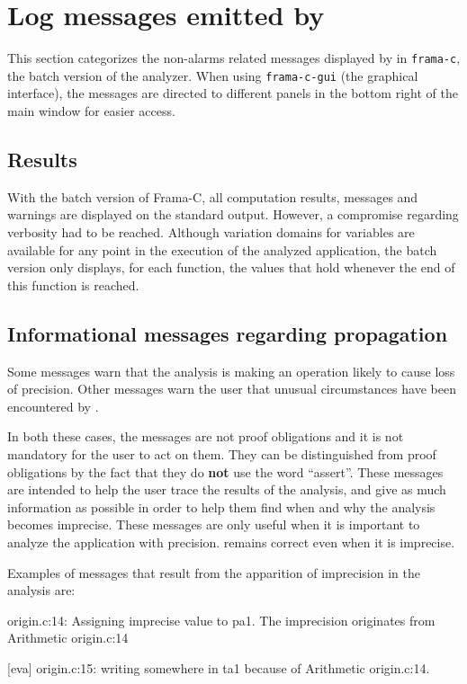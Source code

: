 \documentclass{frama-c-book}
\begin{document}
\section{Log messages emitted by \Eva{}}

This section categorizes the non-alarms related messages displayed by \Eva{}
in \lstinline|frama-c|, the batch version of the analyzer.
When using \lstinline|frama-c-gui| (the graphical interface), the messages
are directed to different panels in the bottom right of the main window
for easier access.

\subsection{Results}

With the batch version of Frama-C, all computation results,
messages and warnings are displayed on the standard output.
However, a compromise regarding verbosity had to
be reached. Although variation domains for variables
are available for any point in the execution of the analyzed application,
the batch version only displays, for each function, the values that
hold whenever the end of this function is reached.



\subsection{Informational messages regarding propagation}

Some messages warn that the analysis is making an operation likely
to cause loss of precision. Other messages warn the user that
unusual circumstances have been encountered by \Eva{}.

In both these cases, the messages are not proof
obligations and it is not mandatory for the user to act on them.
They can be distinguished from proof obligations by the fact that
they do {\bf not} use the word ``assert''.
These messages
are intended to help the user trace the results of the analysis, and
give as much information as possible in order to help
them find when and why the analysis becomes imprecise.
These messages are only useful when it is important to analyze the application
with precision. \Eva{} remains correct even when it
is imprecise.
\smallskip

Examples of messages that result from the apparition of imprecision in the
analysis are:
\begin{logs}
[eva] origin.c:14:
  Assigning imprecise value to pa1.
  The imprecision originates from Arithmetic {origin.c:14}

[eva] origin.c:15:
  writing somewhere in {ta1} because of Arithmetic {origin.c:14}.
\end{logs}
\end{document}
